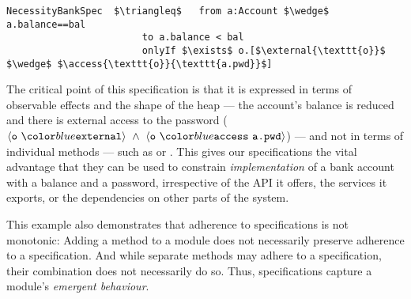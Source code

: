 %
%
%
%
%
%
\begin{lstlisting}[language = Chainmail, mathescape=true, frame=lines]
NecessityBankSpec  $\triangleq$   from a:Account $\wedge$ a.balance==bal
                        to a.balance < bal
                        onlyIf $\exists$ o.[$\external{\texttt{o}}$ $\wedge$ $\access{\texttt{o}}{\texttt{a.pwd}}$]
\end{lstlisting}
%
%
% 
The critical point of this \Nec specification is that it is
expressed in terms of observable effects and the shape of the heap --- the account's balance is reduced 
and there is external access to the password ($\external{\prg{o}}\ \wedge\ \access{\prg{o}}{\prg{a.pwd}}$)
--- and not in terms of individual methods --- such as
 or .
This gives our specifications the
vital advantage that they can be used to constrain
\textit{implementation} of a bank account with a balance and a
password, irrespective of the API it
offers, the services it exports, or the dependencies on other parts of
the system.

{This example also demonstrates that 
adherence to   \Nec specifications is not monotonic:
Adding a method to a module does not necessarily preserve adherence to a specification.
And while separate methods may adhere to a  specification, their combination does
not necessarily do so. Thus, \Nec specifications capture a module's \emph{emergent behaviour}. 
}

